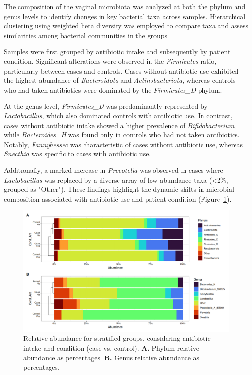 \documentclass[biotech,article,submit,pdftex,moreauthors]{Definitions/mdpi}
\begin{document}
The composition of the vaginal microbiota was analyzed at both the phylum and genus levels to identify changes in key bacterial taxa across samples. Hierarchical clustering using weighted beta diversity was employed to compare taxa and assess similarities among bacterial communities in the groups.

Samples were first grouped by antibiotic intake and subsequently by patient condition. Significant alterations were observed in the \textit{Firmicutes} ratio, particularly between cases and controls. Cases without antibiotic use exhibited the highest abundance of \textit{Bacteroidota} and \textit{Actinobacteriota}, whereas controls who had taken antibiotics were dominated by the \textit{Firmicutes\_D} phylum.

At the genus level, \textit{Firmicutes\_D} was predominantly represented by \textit{Lactobacillus}, which also dominated controls with antibiotic use. In contrast, cases without antibiotic intake showed a higher prevalence of \textit{Bifidobacterium}, while  \textit{Bacteroides\_H} was found only in controls who had not taken antibiotics. Notably, \textit{Fannyhessea} was characteristic of cases without antibiotic use, whereas \textit{Sneathia} was specific to cases with antibiotic use.

Additionally, a marked increase in \textit{Prevotella} was observed in cases where \textit{Lactobacillus} was replaced by a diverse array of low-abundance taxa (<2\%, grouped as "Other"). These findings highlight the dynamic shifts in microbial composition associated with antibiotic use and patient condition (Figure~{\ref{fig:relab}}).

\begin{figure}[H]
    \centering
    \includegraphics[width = \textwidth]{figures/relab.png}
    \caption{ Relative abundance for stratified groups, considering antibiotic intake and condition (case vs. control). \textbf{A.} Phylum relative abundance as percentages. \textbf{B.} Genus relative abundance as percentages.}
	\label{fig:relab}
    \end{figure}
\end{document}
